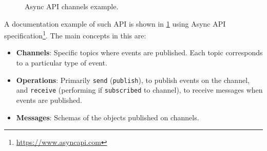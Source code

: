 \documentclass[12pt,a4paper,openright,twoside]{book}
\begin{document}
\begin{figure}
    \centering
    \hfill
    
    \caption{Async \ac{API} channels example.}%
    \label{fig:async-api}
\end{figure}

A documentation example of such \ac{API} is shown in \cref{fig:async-api} using Async \ac{API} specification\footnote{\url{https://www.asyncapi.com}}. The main concepts in this are:

\begin{itemize}
    \item \textbf{Channels}: Specific topics where events are published. Each topic corresponds to a particular type of event.
    \item \textbf{Operations}: Primarily \texttt{send} (\texttt{publish}), to publish events on the channel, and \texttt{receive} (performing if \texttt{subscribed} to channel), to receive messages when events are published.
    \item \textbf{Messages}: Schemas of the objects published on channels.
\end{itemize}
\end{document}
